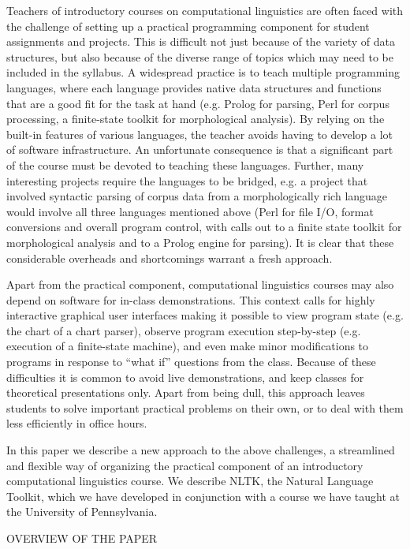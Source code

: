 \documentclass[11pt]{article}
\begin{document}
Teachers of introductory courses on computational linguistics are
often faced with the challenge of setting up a practical programming
component for student assignments and projects.  This is difficult not
just because of the variety of data structures, but also because of
the diverse range of topics which may need to be included in the
syllabus.  A widespread practice is to teach multiple programming
languages, where each language provides native data structures and functions
that are a good fit for the task at hand (e.g. Prolog for parsing,
Perl for corpus processing, a finite-state toolkit for morphological
analysis).  By relying on the built-in features of various languages,
the teacher avoids having to develop a lot of software infrastructure.
An unfortunate consequence is that a significant part of the course
must be devoted to teaching these languages.  Further, many
interesting projects require the languages to be bridged, e.g. a
project that involved syntactic parsing of corpus data from a
morphologically rich language would involve all three languages
mentioned above (Perl for file I/O, format conversions and overall
program control, with calls out to a finite state toolkit for
morphological analysis and to a Prolog engine for parsing).  It is
clear that these considerable overheads and shortcomings warrant a
fresh approach.

Apart from the practical component, computational linguistics courses
may also depend on software for in-class
demonstrations.  This context calls for highly interactive graphical
user interfaces making it possible to view program state (e.g. the
chart of a chart parser), observe program execution step-by-step
(e.g. execution of a finite-state machine), and even make minor
modifications to programs in response to ``what if'' questions from
the class.  Because of these difficulties it is common to avoid live
demonstrations, and keep classes for theoretical presentations only.
Apart from being dull, this approach leaves students to solve
important practical problems on their own, or to deal with them less
efficiently in office hours.

In this paper we describe a new approach to the above challenges,
a streamlined and flexible way of organizing the practical component
of an introductory computational linguistics course.  We describe
NLTK, the Natural Language Toolkit, which we have developed in
conjunction with a course we have taught at the University of Pennsylvania.

OVERVIEW OF THE PAPER
\end{document}

